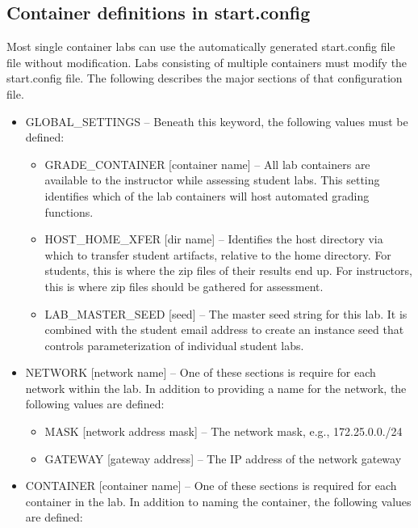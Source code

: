 \documentclass{article}
\begin{document}
\subsection{Container definitions in start.config}
\label{start.config}
Most single container labs can use the automatically generated start.config file file
without modification.  Labs consisting of multiple containers must modify the start.config 
file.  The following describes the major sections of that configuration file.
\begin{itemize}
\item GLOBAL\_SETTINGS -- Beneath this keyword, the following values must be defined:

\begin{itemize}
\item GRADE\_CONTAINER [container name] -- All lab containers are available to the instructor while assessing student labs.
This setting identifies which of the lab containers will host automated grading functions.
\item HOST\_HOME\_XFER [dir name] --  Identifies the host directory via which to transfer student artifacts, relative to 
the home directory.  For students, this is where the zip files of their results end up.  For instructors, this is
where zip files should be gathered for assessment.
\item LAB\_MASTER\_SEED [seed] -- The master seed string for this lab.  It is combined with the student email
address to create an instance seed that controls parameterization of individual student labs.
\end{itemize}

\item NETWORK [network name] -- One of these sections is require for each network within the lab.  In addition to
providing a name for the network, the following values are defined:

\begin{itemize}
\item MASK [network address mask] -- The network mask, e.g., 172.25.0.0./24
\item GATEWAY [gateway address] -- The IP address of the network gateway
\end{itemize}

\item CONTAINER [container name] -- One of these sections is required for each container in the lab.
In addition to naming the container, the following values are defined: 


\end{itemize}
\end{document}
